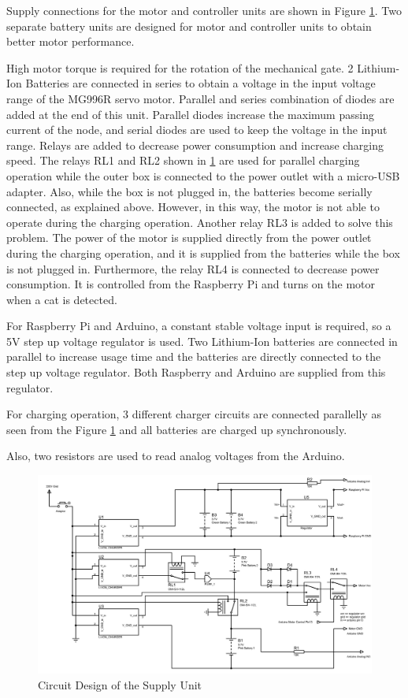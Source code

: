 Supply connections for the motor and controller units are shown in Figure \ref{fig:elecdesign}.
Two separate battery units are designed for motor and controller units to obtain better motor performance. 

High motor torque is required for the rotation of the mechanical gate. 2 Lithium-Ion Batteries are connected in series to obtain a voltage in the input voltage range of the MG996R servo motor. Parallel and series combination of diodes are added at the end of this unit. Parallel diodes increase the maximum passing current of the node, and serial diodes are used to keep the voltage in the input range. Relays are added to decrease power consumption and increase charging speed. The relays RL1 and RL2 shown in \ref{fig:elecdesign} are used for parallel charging operation while the outer box is connected to the power outlet with a micro-USB adapter. Also, while the box is not plugged in, the batteries become serially connected, as explained above. However, in this way, the motor is not able to operate during the charging operation. Another relay RL3 is added to solve this problem. The power of the motor is supplied directly from the power outlet during the charging operation, and it is supplied from the batteries while the box is not plugged in. Furthermore, the relay RL4 is connected to decrease power consumption. It is controlled from the Raspberry Pi and turns on the motor when a cat is detected.

For Raspberry Pi and Arduino, a constant stable voltage input is required, so a 5V step up voltage regulator is used. Two Lithium-Ion batteries are connected in parallel to increase usage time and the batteries are directly connected to the step up voltage regulator. Both Raspberry and Arduino are supplied from this regulator.

For charging operation, 3 different charger circuits are connected parallelly as seen from the Figure \ref{fig:elecdesign} and all batteries are charged up synchronously.

Also, two resistors are used to read analog voltages from the Arduino.


\begin{figure}[H]
     \centering
     \includegraphics[width=1.3\columnwidth, angle=90]{content/050_electrical_design/Design_V2-1.jpg}
     \caption{ Circuit Design of the Supply Unit}
     \label{fig:elecdesign}
\end{figure}


